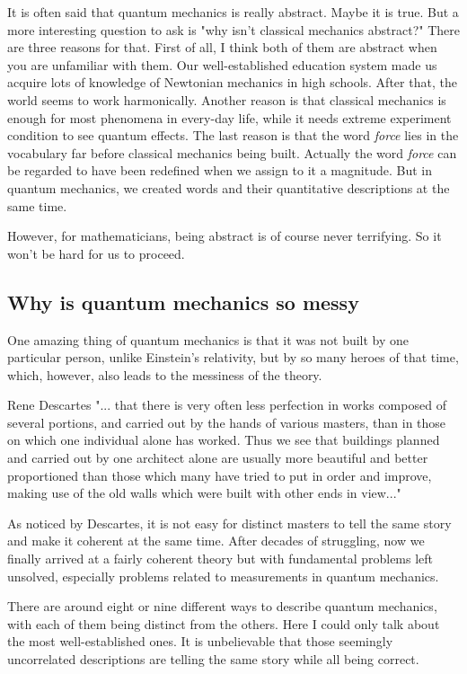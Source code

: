 It is often said that quantum mechanics is really abstract. Maybe it is true. But a more interesting question to ask is "why isn't classical mechanics abstract?" There are three reasons for that. First of all, I think both of them are abstract when you are unfamiliar with them. Our well-established education system made us acquire lots of knowledge of Newtonian mechanics in high schools. After that, the world seems to work harmonically. Another reason is that classical mechanics is enough for most phenomena in every-day life, while it needs extreme experiment condition to see quantum effects. The last reason is that the word \textit{force} lies in the vocabulary far before classical mechanics being built. Actually the word \textit{force} can be regarded to have been redefined when we assign to it a magnitude. But in quantum mechanics, we created words and their quantitative descriptions at the same time.

However, for mathematicians, being abstract is of course never terrifying. So it won't be hard for us to proceed.

\subsection{Why is quantum mechanics so messy}
One amazing thing of quantum mechanics is that it was not built by one particular person, unlike Einstein's relativity, but by so many heroes of that time, which, however, also leads to the messiness of the theory.

\begin{aquote}{Rene Descartes}
"... that there is very often less perfection in works composed of several portions, and carried out by the hands of various masters, than in those on which one individual alone has worked. Thus we see that buildings planned and carried out by one architect alone are usually more beautiful and better proportioned than those which many have tried to put in order and improve, making use of the old walls which were built with other ends in view..."\cite{Discourse on Method}
\end{aquote}

As noticed by Descartes, it is not easy for distinct masters to tell the same story and make it coherent at the same time. After decades of struggling, now we finally arrived at a fairly coherent theory but with fundamental problems left unsolved, especially problems related to measurements in quantum mechanics.

There are around eight or nine different ways to describe quantum mechanics, with each of them being distinct from the others. Here I could only talk about the most well-established ones. It is unbelievable that those seemingly uncorrelated descriptions are telling the same story while all being correct.

